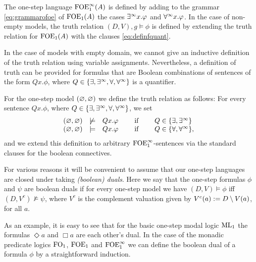 \begin{definition}
\label{d:ofoei}
The one-step language $\mathrm{FOE}^{\infty}_1(A)$ is defined by adding to the grammar 
\eqref{eq:grammarofoe} of $\mathrm{FOE}_1(A)$ the cases $\exists^\infty x. \varphi$ and $\forall^\infty x. \varphi$.
In the case of non-empty models, the truth relation $(D, V),g \models \phi$ is 
defined by extending the truth relation for $\mathrm{FOE}_1(A)$ with the clauses
\eqref{eq:definfquant}.
\end{definition}

In the case of models with empty domain, we cannot give an inductive definition
of the truth relation using variable assignments.
Nevertheless, a definition of truth can be provided for formulas that are Boolean combinations of sentences of the form $Qx.\phi$, where $Q \in \{\exists, \exists^\infty,  \forall, \forall^\infty\}$ is a quantifier.

\begin{definition}
\label{d:ed}
For the one-step model $(\varnothing,\varnothing)$ we define the truth relation as follows:
For every sentence $Qx.\phi$, where $Q \in \{\exists, \exists^\infty,  \forall, \forall^\infty\}$,
we set
\[\begin{array}{lllllll}
     (\nada,\nada) & \not\models & Qx. \phi
   & \quad\text{ if } \quad
   & Q \in  \{\exists, \qu \}
\\ (\nada,\nada)   & \models & Qx. \phi
   & \quad\text{ if } \quad
   & Q \in  \{\forall, \dqu \},
\end{array}\]
and we extend this definition to arbitrary $\mathrm{FOE}^{\infty}_1$-sentences via the standard
clauses for the boolean connectives.
\end{definition}

For various reasons it will be convenient to assume that our one-step languages
are closed under taking \emph{(boolean) duals}.
Here we say that the one-step formulas $\phi$ and $\psi$ are boolean duals if
for every one-step model we have $(D,V) \models \phi$ iff $(D,V^{c}) \not\models 
\psi$, where $V^{c}$ is the complement valuation given by $V^{c}(a) \mathrel{:=}
D \setminus V(a)$, for all $a$.

As an example, it is easy to see that for the basic one-step modal logic $\mathrm{ML}_1$
the formulas $\Diamond a$ and $\Box a$ are each other's dual.
In the case of the monadic predicate logics $\mathrm{FO}_1$, $\mathrm{FOE}_1$ and $\mathrm{FOE}^{\infty}_1$ we can 
define the boolean dual of a formula $\phi$ by a straightforward induction.

